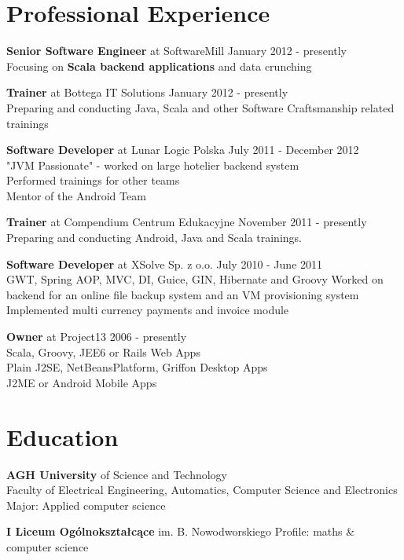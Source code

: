 \documentclass{res}
\begin{document}
\begin{resume} 

\section{Professional Experience}
{\bf Senior Software Engineer} at SoftwareMill \hfill January 2012 - presently \\ 
    Focusing on \textbf{Scala backend applications} and data crunching

{\bf Trainer} at Bottega IT Solutions \hfill January 2012 - presently \\ 
	Preparing and conducting Java, Scala and other Software Craftsmanship related trainings
    
{\bf Software Developer} at Lunar Logic Polska \hfill July 2011 - December 2012 \\ 
    "JVM Passionate" - worked on large hotelier backend system \\ 
    Performed trainings for other teams \\
    Mentor of the Android Team

{\bf Trainer} at Compendium Centrum Edukacyjne \hfill November 2011 - presently \\ 
	Preparing and conducting Android, Java and Scala trainings.
    
{\bf Software Developer} at XSolve Sp. z o.o. \hfill July 2010 - June 2011\\
	GWT, Spring {AOP, MVC, DI}, Guice, GIN, Hibernate and Groovy
	Worked on backend for an online file backup system and an VM provisioning system
	Implemented multi currency payments and invoice module
    
{\bf Owner} at Project13 \hfill 2006 - presently\\
	Scala, Groovy, JEE6 or Rails Web Apps \\
	Plain J2SE, NetBeansPlatform, Griffon Desktop Apps \\
	J2ME or Android Mobile Apps 

\section{Education} 
{\bf AGH University} of Science and Technology\\ 
	Faculty of Electrical Engineering, Automatics, Computer Science and Electronics\\
	Major: Applied computer science

{\bf I Liceum Ogólnokształcące} im. B. Nowodworskiego 
	Profile: maths \& computer science


\end{resume}
\end{document}
